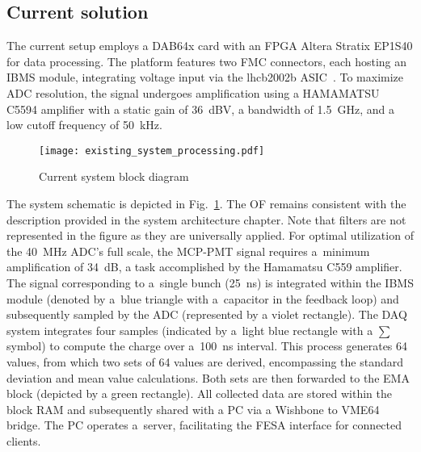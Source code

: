 \subsection{Current solution}
The current setup employs a DAB64x card with an FPGA Altera Stratix EP1S40 for
data processing. The platform features two FMC connectors, each hosting an IBMS
module, integrating voltage input via the lhcb2002b ASIC~\cite{lhcb_asic}. To
maximize ADC resolution, the signal undergoes amplification using a HAMAMATSU
C5594 amplifier with a static gain of \SI{36}{dBV}, a bandwidth of
\SI{1.5}{GHz}, and a low cutoff frequency of \SI{50}{kHz}.

\begin{figure}[!tbh]
    \centering
    \texttt{[image: existing\_system\_processing.pdf]}
    \caption{Current system block diagram}
    \label{fig:current_system_processing}
\end{figure}


The system schematic is depicted in Fig.~\ref{fig:current_system_processing}.
The OF remains consistent with the description provided
in the system architecture chapter. Note that filters are not represented in the
figure as they are universally applied. For optimal utilization of the \SI{40}{MHz}
ADC's full scale, the MCP-PMT signal requires a~minimum amplification of
\SI{34}{dB}, a task accomplished by the Hamamatsu C559
amplifier\cite{bsra_first_operation}.\\
The signal corresponding to a~single bunch (\SI{25}{ns})
is integrated within the IBMS module (denoted by a~blue triangle with a~capacitor in the feedback loop) and subsequently sampled by the ADC
(represented by a violet rectangle). The DAQ system integrates four samples
(indicated by a~light blue rectangle with a $\sum$ symbol) to compute the
charge over a~\SI{100}{ns} interval. This process generates 64 values, from
which two sets of 64 values are derived, encompassing the standard deviation
and mean value calculations. Both sets are then forwarded to the EMA block (depicted by a green rectangle). All collected data
are stored within the block RAM and subsequently shared with a PC via a
Wishbone to VME64 bridge. The PC operates a~server, facilitating the FESA
interface for connected clients.

